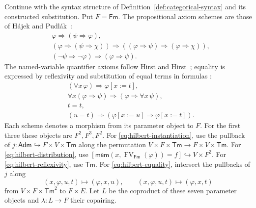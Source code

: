 \documentclass[11pt]{article}
\theoremstyle{definition}\newtheorem{definition}[theorem]{Definition}
\newcommand{\Tm}{\mathsf{Tm}}
\newcommand{\Fm}{\mathsf{Fm}}
\newcommand{\FV}{\operatorname{FV}}
\newcommand{\Adm}{\mathsf{Adm}}
\newcommand{\mem}{\mathsf{mem}}
\begin{document}
Continue with the syntax structure of
Definition~\ref{def:categorical-syntax} and its constructed substitution.
Put $F=\Fm$. The propositional axiom schemes are those of
H\'ajek and Pudl\'ak~\cite[Section 0.10]{HP}:
\begin{align}
 &\varphi\Rightarrow(\psi\Rightarrow\varphi),
                                                        \label{eq:hilbert-one}\\
 &(\varphi\Rightarrow(\psi\Rightarrow\chi))
   \Rightarrow((\varphi\Rightarrow\psi)
   \Rightarrow(\varphi\Rightarrow\chi)),
                                                        \label{eq:hilbert-two}\\
 &(\neg\psi\Rightarrow\neg\varphi)
   \Rightarrow(\varphi\Rightarrow\psi).
                                                        \label{eq:hilbert-three}
\end{align}
The named-variable quantifier axioms follow
Hirst and Hirst~\cite[Sections 2.11--2.12]{HH}; equality is expressed
by reflexivity and substitution of equal terms in formulas
\cite[Section 3.1]{HH}:
\begin{align}
 &(\forall x\,\varphi)\Rightarrow\varphi[x:=t],
                                                        \label{eq:hilbert-instantiation}\\
 &\forall x(\varphi\Rightarrow\psi)
       \Rightarrow(\varphi\Rightarrow\forall x\,\psi),
                                                        \label{eq:hilbert-distribution}\\
 &t=t,                                                   \label{eq:hilbert-reflexivity}\\
 &(u=t)\Rightarrow
       (\varphi[x:=u]\Rightarrow\varphi[x:=t]).           \label{eq:hilbert-equality}
\end{align}
Each scheme denotes a morphism from its parameter object to $F$.
For the first three these objects are $F^2,F^3,F^2$.
For \eqref{eq:hilbert-instantiation}, use the pullback of
$j:\Adm\hookrightarrow F\times V\times\Tm$ along the
permutation $V\times F\times\Tm\to F\times V\times\Tm$.
For \eqref{eq:hilbert-distribution}, use
$[\mem(x,\FV_{\Fm}(\varphi))=f]
\hookrightarrow V\times F^2$.
For \eqref{eq:hilbert-reflexivity}, use $\Tm$.
For \eqref{eq:hilbert-equality}, intersect the pullbacks of $j$
along
\[
 (x,\varphi,u,t)\longmapsto(\varphi,x,u),\qquad
 (x,\varphi,u,t)\longmapsto(\varphi,x,t)
\]
from $V\times F\times\Tm^2$ to $F\times E$.
Let $L$ be the coproduct of these seven parameter objects and
$\lambda:L\to F$ their copairing.
\end{document}
